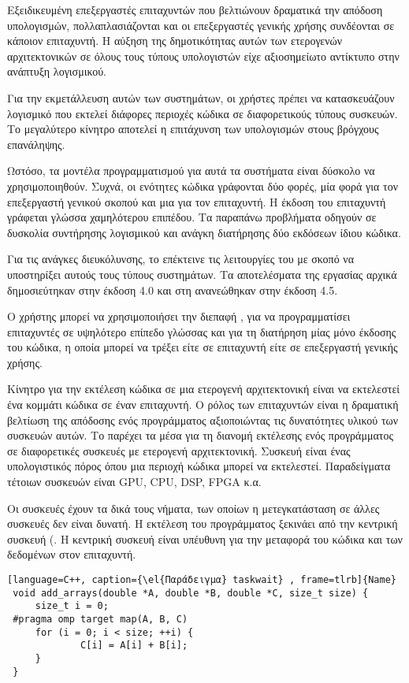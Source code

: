 Εξειδικευμένη επεξεργαστές επιταχυντών που βελτιώνουν δραματικά την απόδοση υπολογισμών, πολλαπλασιάζονται και οι επεξεργαστές γενικής χρήσης συνδέονται σε κάποιον επιταχυντή. Η αύξηση της δημοτικότητας αυτών των ετερογενών αρχιτεκτονικών σε όλους τους τύπους υπολογιστών είχε αξιοσημείωτο αντίκτυπο στην ανάπτυξη λογισμικού.

Για την εκμετάλλευση αυτών των συστημάτων, οι χρήστες πρέπει να κατασκευάζουν λογισμικό που εκτελεί διάφορες περιοχές κώδικα σε διαφορετικούς τύπους συσκευών. Το μεγαλύτερο κίνητρο αποτελεί η επιτάχυνση των υπολογισμών στους βρόγχους επανάληψης.

Ωστόσο, τα μοντέλα προγραμματισμού για αυτά τα συστήματα είναι δύσκολο να χρησιμοποιηθούν. Συχνά, οι ενότητες κώδικα γράφονται δύο φορές, μία φορά για τον επεξεργαστή γενικού σκοπού και μια για τον επιταχυντή. Η έκδοση του επιταχυντή γράφεται γλώσσα χαμηλότερου επιπέδου.
Τα παραπάνω προβλήματα οδηγούν σε δυσκολία συντήρησης λογισμικού και ανάγκη διατήρησης δύο εκδόσεων ίδιου κώδικα.

Για τις ανάγκες διευκόλυνσης, το \emph{} επέκτεινε τις λειτουργίες του με σκοπό να υποστηρίξει αυτούς τους τύπους συστημάτων\cite{barbara}. Τα αποτελέσματα της εργασίας αρχικά δημοσιεύτηκαν στην έκδοση 4.0 και στη ανανεώθηκαν στην έκδοση 4.5.

Ο χρήστης μπορεί να χρησιμοποιήσει την διεπαφή \emph{}, για να προγραμματίσει επιταχυντές σε υψηλότερο επίπεδο γλώσσας και για τη διατήρηση μίας μόνο έκδοσης του κώδικα, η οποία μπορεί να τρέξει είτε σε επιταχυντή είτε σε επεξεργαστή γενικής χρήσης.

Κίνητρο για την εκτέλεση κώδικα σε μια ετερογενή αρχιτεκτονική είναι να εκτελεστεί ένα κομμάτι κώδικα σε έναν επιταχυντή. Ο ρόλος των επιταχυντών είναι η δραματική βελτίωση της απόδοσης ενός προγράμματος αξιοποιώντας τις δυνατότητες υλικού των συσκευών αυτών. Το \emph{} παρέχει τα μέσα για τη διανομή εκτέλεσης ενός προγράμματος σε διαφορετικές συσκευές με ετερογενή αρχιτεκτονική. Συσκευή είναι ένας υπολογιστικός πόρος όπου μια περιοχή κώδικα μπορεί να εκτελεστεί. Παραδείγματα τέτοιων συσκευών είναι GPU, CPU, DSP, FPGA κ.α.

Οι συσκευές έχουν τα δικά τους νήματα, των οποίων η μετεγκατάσταση σε άλλες συσκευές δεν είναι δυνατή. Η εκτέλεση του προγράμματος ξεκινάει από την κεντρική συσκευή (\emph{}. Η κεντρική συσκευή είναι υπέυθυνη για την μεταφορά του κώδικα και των δεδομένων στον επιταχυντή.

\begin{lstlisting}[language=C++, caption={\el{Παράδειγμα} taskwait} , frame=tlrb]{Name}
 void add_arrays(double *A, double *B, double *C, size_t size) {
     size_t i = 0;
 #pragma omp target map(A, B, C)
     for (i = 0; i < size; ++i) {
             C[i] = A[i] + B[i];
     }
 }
\end{lstlisting}

